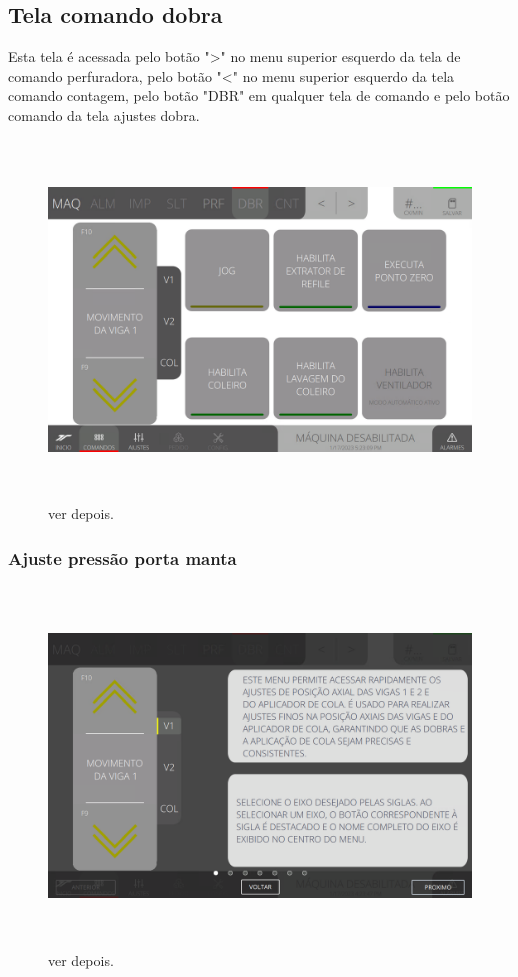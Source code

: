 \thispagestyle{fancy}
\vspace*{\fill}
\subsection{Tela comando dobra}
 Esta tela é acessada pelo botão "\textgreater" no menu superior esquerdo da tela de comando perfuradora, pelo botão "\textless{}" no menu superior esquerdo da tela comando contagem, pelo botão "DBR" em qualquer tela de comando e pelo botão comando da tela ajustes dobra.
\begin{figure}[h]
  \centering
  \includegraphics[width=576px,height=360px]{src/imagesFlexo/07-fold/commands/e-Tela-Principal.png}
  \caption{ver depois.}
   \label{}
\end{figure}

\newpage
\thispagestyle{fancy}
\vspace*{\fill}
\subsubsection{\small{Ajuste pressão porta manta}}
\begin{figure}[h]
  \centering
  \includegraphics[width=576px,height=360px]{src/imagesFlexo/07-fold/commands/e-1.png}
  \caption{ver depois.}
   \label{}
\end{figure}
\vspace*{\fill}


